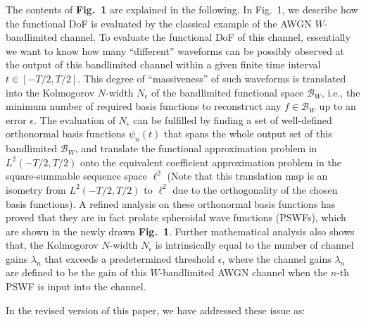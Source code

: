 \documentclass[a4paper,12pt]{article}
\begin{document}
{    \quad The contents of {\bf Fig.~1} are explained in the following. In Fig.~1, we describe how the functional DoF is evaluated by the classical example of the AWGN $W$-bandlimited channel. To evaluate the functional DoF of this channel, essentially we want to know how many ``different'' waveforms can be possibly observed at the output of this bandlimited channel within a given finite time interval $t\in[-T/2, T/2]$. 
    This degree of ``massiveness'' of such waveforms is translated into the Kolmogorov $N$-width $N_\epsilon$ of the bandlimited functional space ${\mathcal{B}_W}$, i.e., the minimum number of required basis functions to reconstruct any $f\in\mathcal{B}_W$ up to an error $\epsilon$.  
    The evaluation of $N_\epsilon$ can be fulfilled by finding a set of well-defined orthonormal basis functions $\psi_n(t)$ that spans the whole output set of this bandlimited $\mathcal{B}_W$, and translate the functional approximation problem in $L^2(-T/2, T/2)$ onto the equivalent coefficient approximation problem in the square-summable sequence space $\ell^2$ (Note that this translation map is an isometry from $L^2(-T/2, T/2)$ to $\ell^2$ due to the orthogonality of the chosen basis functions). A refined analysis on these orthonormal basis functions has proved that they are in fact prolate spheroidal wave functions (PSWFs), which are shown in the newly drawn {\bf Fig.~1}. Further mathematical analysis also shows that, the Kolmogorov $N$-width $N_\epsilon$ is intrinsically equal to the number of channel gains $\lambda_n$ that exceeds a predetermined threshold $\epsilon$, where the channel gains $\lambda_n$ are defined to be the gain of this $W$-bandlimited AWGN channel when the $n$-th PSWF is input into the channel. 


    In the revised version of this paper, we have addressed these issue as:

}
\end{document}
